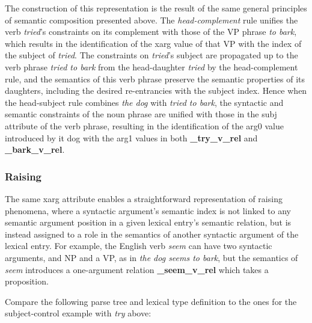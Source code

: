 \documentclass[12pt]{article}
\begin{document}
The construction of this representation is the result of the same general
principles of semantic composition presented above.  The {\it head-complement} rule 
unifies the verb {\it tried}'s constraints on
its complement with those of the VP phrase {\it to bark}, which results in the
identification of the {\sc xarg} value of that VP with the {\sc index} of the 
subject of {\it tried}.  The constraints on {\it tried}'s subject are propagated up
to the verb phrase {\it tried to bark} from the head-daughter {\it tried} by
the head-complement rule, and the semantics of this verb phrase preserve the
semantic properties of its daughters, including the desired re-entrancies with
the subject index.  Hence when the head-subject rule combines {\it the dog}
with {\it tried to bark}, the syntactic and semantic constraints of the noun
phrase are unified with those in the {\sc subj} attribute of the verb phrase,
resulting in the identification of the {\sc arg0} value introduced by {it dog}
with the {\sc arg1} values in both {\bf \_try\_v\_rel} and {\bf \_bark\_v\_rel}.

\subsubsection{Raising}

The same {\sc xarg} attribute enables a straightforward representation of
raising phenomena, where a syntactic argument's semantic index is not linked
to any semantic argument position in a given lexical entry's semantic relation,
but is instead assigned to a role in the semantics of another syntactic 
argument of the lexical entry.  For example, the English verb {\it seem} can
have two syntactic arguments, and NP and a VP, as in {\it the dog seems to
bark}, but the semantics of {\it seem} introduces a one-argument relation
{\bf \_seem\_v\_rel} which takes a proposition.

Compare the following parse tree and lexical type definition to the ones
for the subject-control example with {\it try} above:
\end{document}
